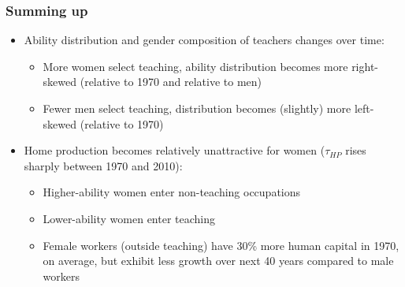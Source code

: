 \documentclass[11pt,hyperref={bookmarks=false},table,aspectratio=169]{beamer}
\begin{document}
\begin{frame}\label{benchmark_sum}
\frametitle{Summing up}
\begin{itemize}
    \item Ability distribution and gender composition of teachers changes over time:
    \begin{itemize}
		\item More women select teaching, ability distribution becomes more right-skewed (relative to 1970 and relative to men) \hyperlink{density_T_f}{}%
                 \item Fewer men select teaching, distribution becomes (slightly) more left-skewed (relative to 1970) \hyperlink{density_T_m}{} %
    \end{itemize}
    \item Home production becomes relatively unattractive for women ($\tau_{HP}$ rises sharply between 1970 and 2010):
    	\begin{itemize}
  \item Higher-ability women enter non-teaching occupations
  \item Lower-ability women enter teaching
  \item Female workers (outside teaching) have 30\% more human capital in 1970, on average, but exhibit less growth over next 40 years compared to male workers
\end{itemize}
\end{itemize}
\hyperlink{cf1}{} \hyperlink{cf2}{} \hyperlink{conclusion}{}
\end{frame}
\end{document}
